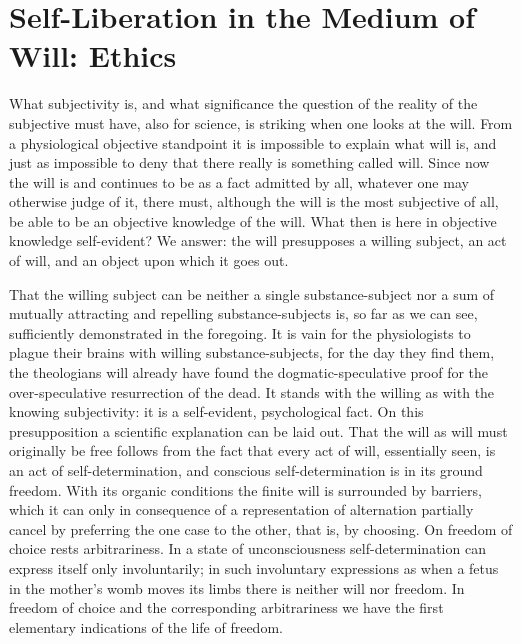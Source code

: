\documentclass[12pt]{book}
\begin{document}
\section{Self-Liberation in the Medium of Will: Ethics}
\label{sec:24en}

\noindent What subjectivity is, and what significance the question of the reality of the
subjective must have, also for science, is striking when one looks at the will. From a
physiological objective standpoint it is impossible to explain what will is, and just as
impossible to deny that there really is something called will. Since now the will is and
continues to be as a fact admitted by all, whatever one may otherwise judge of it, there must,
although the will is the most subjective of all, be able to be an objective knowledge of the
will. What then is here in objective knowledge self-evident? We answer: the will presupposes a
willing subject, an act of will, and an object upon which it goes out.

That the willing subject can be neither a single substance-subject nor a sum of mutually
attracting and repelling substance-subjects is, so far as we can see, sufficiently demonstrated
in the foregoing. It is vain for the physiologists to plague their brains with willing
substance-subjects, for the day they find them, the theologians will already have found the
dogmatic-speculative proof for the over-speculative resurrection of the dead. It stands with the
willing as with the knowing subjectivity: it is a self-evident, psychological fact. On this
presupposition a scientific explanation can be laid out. That the will as will must originally be
free follows from the fact that every act of will, essentially seen, is an act of
self-determination, and conscious self-determination is in its ground freedom. With its organic
conditions the finite will is surrounded by barriers, which it can only in consequence of a
representation of alternation partially cancel by preferring the one case to the other, that is,
by choosing. On freedom of choice rests arbitrariness. In a state of unconsciousness
self-determination can express itself only involuntarily; in such involuntary expressions as
when a fetus in the mother's womb moves its limbs there is neither will nor freedom. In freedom
of choice and the corresponding arbitrariness we have the first elementary indications of the
life of freedom.
\end{document}
